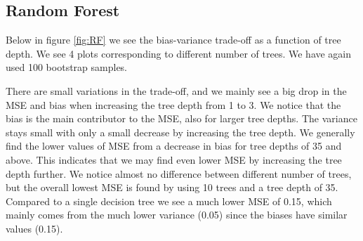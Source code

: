 \documentclass[11pt]{article}
\begin{document}
\subsection*{Random Forest}
Below in figure \ref{fig:RF} we see the bias-variance trade-off as a function of tree depth. We see 4 plots corresponding to different number of trees. We have again used 100 bootstrap samples.

There are small variations in the trade-off, and we mainly see a big drop in the MSE and bias when increasing the tree depth from 1 to 3. We notice that the bias is the main contributor to the MSE, also for larger tree depths. The variance stays small with only a small decrease by increasing the tree depth. We generally find the lower values of MSE from a decrease in bias for tree depths of 35 and above. This indicates that we may find even lower MSE by increasing the tree depth further. We notice almost no difference between different number of trees, but the overall lowest MSE is found by using 10 trees and a tree depth of 35. Compared to a single decision tree we see a much lower MSE of 0.15, which mainly comes from the much lower variance (0.05) since the biases have similar values (0.15).
\end{document}
